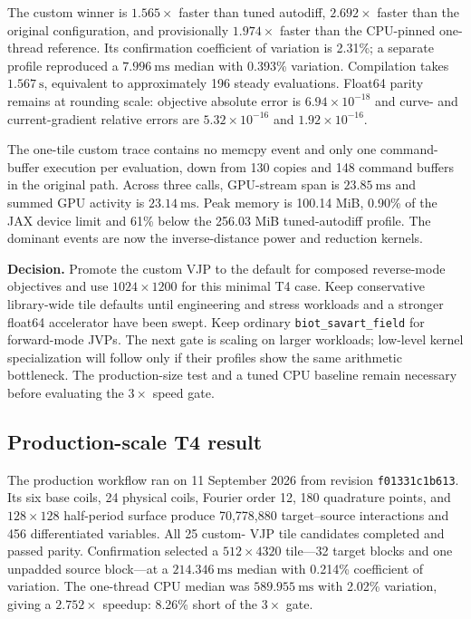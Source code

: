 \documentclass[11pt,a4paper]{article}
\newcommand{\code}[1]{\texttt{#1}}
\begin{document}
The custom winner is $1.565\times$ faster than tuned autodiff,
$2.692\times$ faster than the original configuration, and provisionally
$1.974\times$ faster than the CPU-pinned one-thread reference.  Its confirmation
coefficient of variation is 2.31\%; a separate profile reproduced a
$7.996\ \mathrm{ms}$ median with 0.393\% variation.  Compilation takes
$1.567\ \mathrm{s}$, equivalent to approximately 196 steady evaluations.
Float64 parity remains at rounding scale: objective absolute error is
$6.94\times10^{-18}$ and curve- and current-gradient relative errors are
$5.32\times10^{-16}$ and $1.92\times10^{-16}$.

The one-tile custom trace contains no memcpy event and only one command-buffer
execution per evaluation, down from 130 copies and 148 command buffers in the
original path.  Across three calls, GPU-stream span is $23.85\ \mathrm{ms}$ and
summed GPU activity is $23.14\ \mathrm{ms}$.  Peak memory is 100.14 MiB, 0.90\%
of the JAX device limit and 61\% below the 256.03 MiB tuned-autodiff profile.
The dominant events are now the inverse-distance power and reduction kernels.

\textbf{Decision.}  Promote the custom VJP to the default for composed
reverse-mode objectives and use $1024\times1200$ for this minimal T4 case.
Keep conservative library-wide tile defaults until engineering and stress
workloads and a stronger float64 accelerator have been swept.  Keep ordinary
\code{biot\_savart\_field} for forward-mode JVPs.  The next gate is scaling on
larger workloads; low-level kernel specialization will follow only if their
profiles show the same arithmetic bottleneck.  The production-size test and a
tuned CPU baseline remain necessary before evaluating the $3\times$ speed gate.

\subsection{Production-scale T4 result}

The production workflow ran on 11 September 2026 from revision
\code{f01331c1b613}.  Its six base coils, 24 physical coils, Fourier order 12,
180 quadrature points, and $128\times128$ half-period surface produce 70,778,880
target--source interactions and 456 differentiated variables.  All 25 custom-
VJP tile candidates completed and passed parity.  Confirmation selected a
$512\times4320$ tile---32 target blocks and one unpadded source block---at a
$214.346\ \mathrm{ms}$ median with 0.214\% coefficient of variation.  The
one-thread CPU median was $589.955\ \mathrm{ms}$ with 2.02\% variation, giving
a $2.752\times$ speedup: 8.26\% short of the $3\times$ gate.
\end{document}
